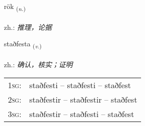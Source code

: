 \documentclass[frontgrid, backgrid]{flacards}\usepackage[]{graphicx}\usepackage[]{xcolor}
\begin{document}
\renewcommand{\flhead}{\vskip5pt \fboxsep=0pt {\small\bfseries\footnotesize Nafnorð | 名词}}
\renewcommand{\fcfoot}{\vskip5pt \fboxsep=0pt \hspace{2pt}{\small\bfseries\footnotesize 1K}}

\renewcommand{\blhead}{\vskip5pt {\small\bfseries\footnotesize Nafnorð | 名词 }}
\renewcommand{\bcfoot}{\vskip5pt \hspace{2pt}{\small\bfseries\footnotesize 1K}}


{rök \small{\textsubscript{(\textit{n.})}} \\[1ex] %
\textphonetic{[rœːk]} \\
zh.: \emph{推理，论据} \\  [2ex]
\renewcommand*{\arraystretch}{0.8}
}

\renewcommand{\flhead}{\vskip5pt \fboxsep=0pt {\small\bfseries\footnotesize Sagnorð | 动词}}
\renewcommand{\fcfoot}{\vskip5pt \fboxsep=0pt \hspace{2pt}{\small\bfseries\footnotesize 1K}}

\renewcommand{\blhead}{\vskip5pt {\small\bfseries\footnotesize Sagnorð | 动词 }}
\renewcommand{\bcfoot}{\vskip5pt \hspace{2pt}{\small\bfseries\footnotesize 1K}}


{staðfesta \small{\textsubscript{(\textit{v.})}} \\[1ex] %
\textphonetic{[staðfɛsta]} \\
zh.: \emph{确认，核实；证明} \\  [2ex]
\renewcommand*{\arraystretch}{0.8}
\begin{tabular}{p{1cm}l}
\textsc{1sg}: & staðfesti -- staðfesti -- staðfest \\ 
\textsc{2sg}: & staðfestir -- staðfestir -- staðfest \\ 
\textsc{3sg}: & staðfestir -- staðfesti -- staðfest \\ 
\end{tabular}
}
\end{document}
